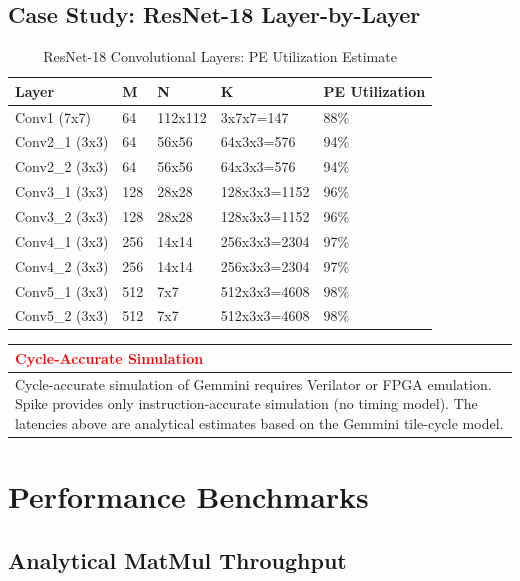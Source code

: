 \documentclass[12pt,a4paper]{article}
\newenvironment{warningbox}[1][Warning]{
    \begin{center}
    \begin{tabular}{|p{0.95\textwidth}|}
    \hline
    \textcolor{red}{\textbf{#1}} \\
    \hline
    \begin{minipage}{0.93\textwidth}
}{
    \end{minipage} \\
    \hline
    \end{tabular}
    \end{center}
}
\begin{document}
\subsection{Case Study: ResNet-18 Layer-by-Layer}

\begin{table}[H]
\centering
\begin{tabular}{|p{}|p{}|p{}|p{}|p{}|}
\hline
\textbf{Layer} & \textbf{M} & \textbf{N} & \textbf{K} & \textbf{PE Utilization} \\
\hline
Conv1 (7x7) & 64 & 112x112 & 3x7x7=147 & 88\% \\
\hline
Conv2\_1 (3x3) & 64 & 56x56 & 64x3x3=576 & 94\% \\
\hline
Conv2\_2 (3x3) & 64 & 56x56 & 64x3x3=576 & 94\% \\
\hline
Conv3\_1 (3x3) & 128 & 28x28 & 128x3x3=1152 & 96\% \\
\hline
Conv3\_2 (3x3) & 128 & 28x28 & 128x3x3=1152 & 96\% \\
\hline
Conv4\_1 (3x3) & 256 & 14x14 & 256x3x3=2304 & 97\% \\
\hline
Conv4\_2 (3x3) & 256 & 14x14 & 256x3x3=2304 & 97\% \\
\hline
Conv5\_1 (3x3) & 512 & 7x7 & 512x3x3=4608 & 98\% \\
\hline
Conv5\_2 (3x3) & 512 & 7x7 & 512x3x3=4608 & 98\% \\
\hline
\end{tabular}
\caption{ResNet-18 Convolutional Layers: PE Utilization Estimate}
\end{table}

\begin{warningbox}[Cycle-Accurate Simulation]
Cycle-accurate simulation of Gemmini requires Verilator or FPGA emulation. Spike provides only instruction-accurate simulation (no timing model). The latencies above are analytical estimates based on the Gemmini tile-cycle model.
\end{warningbox}

\section{Performance Benchmarks}

\subsection{Analytical MatMul Throughput}
\end{document}
